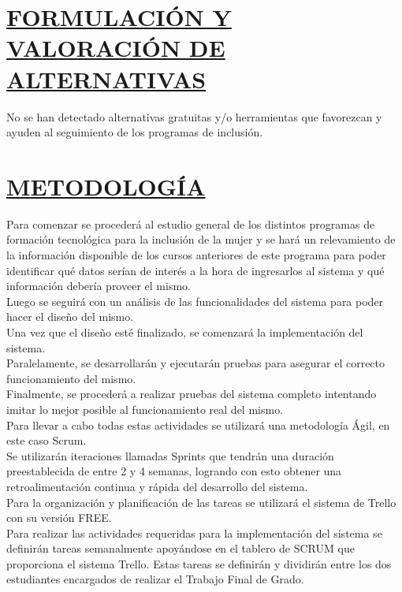 \section*{\underline{FORMULACIÓN Y VALORACIÓN DE ALTERNATIVAS}}
No se han detectado alternativas gratuitas y/o herramientas que favorezcan y ayuden al seguimiento de los programas de inclusión.\\


\section*{\underline{METODOLOGÍA}}
Para comenzar se procederá al estudio general de los distintos programas de formación tecnológica para la inclusión de la mujer y se hará un relevamiento de la información disponible de los cursos anteriores de este programa para poder identificar qué datos serían de interés a la hora de ingresarlos al sistema y qué información debería proveer el mismo.\\

Luego se seguirá con un análisis de las funcionalidades del sistema para poder hacer el diseño del mismo.\\

Una vez que el diseño esté finalizado, se comenzará la implementación del sistema.\\

Paralelamente, se desarrollarán y ejecutarán pruebas para asegurar el correcto funcionamiento del mismo.\\

Finalmente, se procederá a realizar pruebas del sistema completo intentando imitar lo mejor posible al funcionamiento real del mismo.\\

Para llevar a cabo todas estas actividades se utilizará una metodología Ágil, en este caso Scrum.\\

Se utilizarán iteraciones llamadas Sprints que tendrán una duración preestablecida de entre 2 y 4 semanas, logrando con esto obtener una retroalimentación continua y rápida del desarrollo del sistema.\\

Para la organización y planificación de las tareas se utilizará el sistema de Trello con su versión FREE. \\

Para realizar las actividades requeridas para la implementación del sistema se definirán tareas semanalmente apoyándose en el tablero de SCRUM que proporciona el sistema Trello. Estas tareas se definirán y dividirán entre los dos estudiantes encargados de realizar el Trabajo Final de Grado.\\

